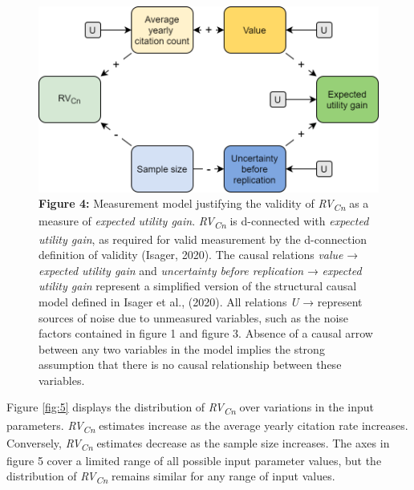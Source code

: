 \documentclass[
  english,
  jou,floatsintext]{apa6}
\begin{document}
\begin{figure}
\centering
\includegraphics{figure_4.png}
\caption{\textbf{Figure 4:} Measurement model justifying the validity of \emph{RV\textsubscript{Cn}} as a measure of \emph{expected utility gain}. \emph{RV\textsubscript{Cn}} is d-connected with \emph{expected utility gain}, as required for valid measurement by the d-connection definition of validity (Isager, 2020). The causal relations \emph{value} → \emph{expected utility gain} and \emph{uncertainty before replication} → \emph{expected utility gain} represent a simplified version of the structural causal model defined in Isager et al., (2020). All relations \emph{U} → represent sources of noise due to unmeasured variables, such as the noise factors contained in figure 1 and figure 3. Absence of a causal arrow between any two variables in the model implies the strong assumption that there is no causal relationship between these variables. \label{fig:4}}
\end{figure}

Figure \ref{fig:5} displays the distribution of \emph{RV\textsubscript{Cn}} over variations in the input parameters. \emph{RV\textsubscript{Cn}} estimates increase as the average yearly citation rate increases. Conversely, \emph{RV\textsubscript{Cn}} estimates decrease as the sample size increases. The axes in figure 5 cover a limited range of all possible input parameter values, but the distribution of \emph{RV\textsubscript{Cn}} remains similar for any range of input values.
\end{document}
